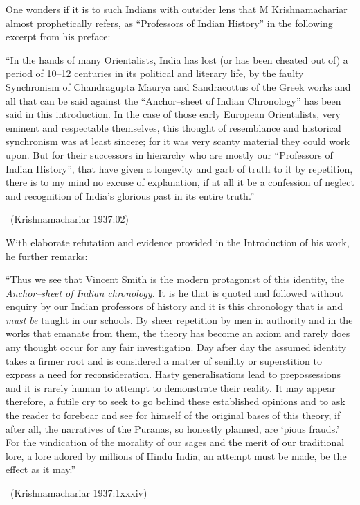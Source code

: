 One wonders if it is to such Indians with outsider lens that M Krishnamachariar almost prophetically refers, as “Professors of Indian History” in the following excerpt from his preface:

\begin{myquote}
“In the hands of many Orientalists, India has lost (or has been cheated out of) a period of 10–12 centuries in its political and literary life, by the faulty Synchronism of Chandragupta Maurya and Sandracottus of the Greek works and all that can be said against the “Anchor–sheet of Indian Chronology” has been said in this introduction. In the case of those early European Orientalists, very eminent and respectable themselves, this thought of resemblance and historical synchronism was at least sincere; for it was very scanty material they could work upon. But for their successors in hierarchy who are mostly our “Professors of Indian History”, that have given a longevity and garb of truth to it by repetition, there is to my mind no excuse of explanation, if at all it be a confession of neglect and recognition of India’s glorious past in its entire truth.” 

~\hfill (Krishnamachariar 1937:02)
\end{myquote}

With elaborate refutation and evidence provided in the Introduction of his work, he further remarks:

\begin{myquote}
“Thus we see that Vincent Smith is the modern protagonist of this identity, the \textit{Anchor–sheet of Indian chronology.} It is he that is quoted and followed without enquiry by our Indian professors of history and it is this chronology that is and \textit{must be} taught in our schools. By sheer repetition by men in authority and in the works that emanate from them, the theory has become an axiom and rarely does any thought occur for any fair investigation. Day after day the assumed identity takes a firmer root and is considered a matter of senility or superstition to express a need for reconsideration. Hasty generalisations lead to prepossessions and it is rarely human to attempt to demonstrate their reality. It may appear therefore, a futile cry to seek to go behind these established opinions and to ask the reader to forebear and see for himself of the original bases of this theory, if after all, the narratives of the Puranas, so honestly planned, are ‘pious frauds.’ For the vindication of the morality of our sages and the merit of our traditional lore, a lore adored by millions of Hindu India, an attempt must be made, be the effect as it may.” 

~\hfill (Krishnamachariar 1937:1xxxiv)
\end{myquote}

